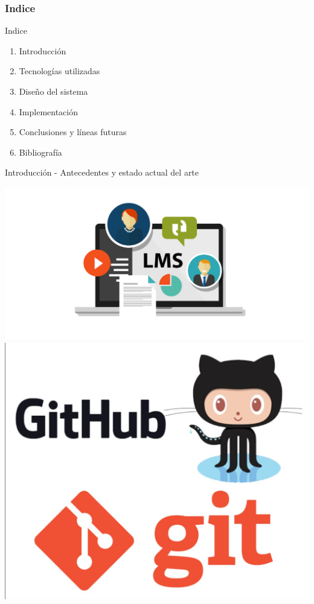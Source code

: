 \documentclass{beamer}
\begin{document}
\begin{frame}[allowframebreaks]
\frametitle{Indice}
\tableofcontents
\end{frame} 

        \begin{frame}{Indice}
            \begin{enumerate}
                \item Introducción
                \item Tecnologías utilizadas
                \item Diseño del sistema
                \item Implementación
                \item Conclusiones y líneas futuras
                \item Bibliografía
            \end{enumerate}
        \end{frame}


        \begin{frame}{Introducción - Antecedentes y estado actual del arte}
            \begin{center}
            	\includegraphics[width=.55\textwidth]{Presentacion/introduccion/lms.png} 
            	\includegraphics[width=.35\textwidth]{Presentacion/introduccion/git.png}    
            \end{center}
        \end{frame}
\end{document}
